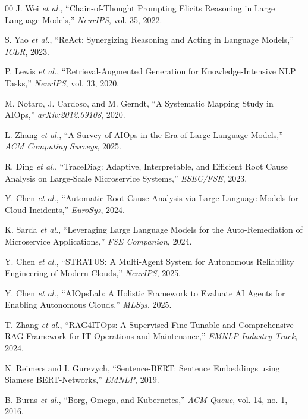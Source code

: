 \documentclass[conference]{IEEEtran}
\begin{document}
{\scriptsize
\begin{thebibliography}{00}
\setlength{\itemsep}{0pt}
\setlength{\parskip}{0pt}
J. Wei \emph{et al.}, ``Chain-of-Thought Prompting Elicits Reasoning in
Large Language Models,'' \emph{NeurIPS}, vol. 35, 2022.

S. Yao \emph{et al.}, ``ReAct: Synergizing Reasoning and Acting in
Language Models,'' \emph{ICLR}, 2023.

P. Lewis \emph{et al.}, ``Retrieval-Augmented Generation for
Knowledge-Intensive NLP Tasks,'' \emph{NeurIPS}, vol. 33, 2020.

M. Notaro, J. Cardoso, and M. Gerndt, ``A Systematic Mapping Study in
AIOps,'' \emph{arXiv:2012.09108}, 2020.

L. Zhang \emph{et al.}, ``A Survey of AIOps in the Era of Large Language
Models,'' \emph{ACM Computing Surveys}, 2025.

R. Ding \emph{et al.}, ``TraceDiag: Adaptive, Interpretable, and
Efficient Root Cause Analysis on Large-Scale Microservice Systems,''
\emph{ESEC/FSE}, 2023.

Y. Chen \emph{et al.}, ``Automatic Root Cause Analysis via Large Language
Models for Cloud Incidents,'' \emph{EuroSys}, 2024.

K. Sarda \emph{et al.}, ``Leveraging Large Language Models for the
Auto-Remediation of Microservice Applications,'' \emph{FSE Companion},
2024.

Y. Chen \emph{et al.}, ``STRATUS: A Multi-Agent System for Autonomous
Reliability Engineering of Modern Clouds,'' \emph{NeurIPS}, 2025.

Y. Chen \emph{et al.}, ``AIOpsLab: A Holistic Framework to Evaluate AI
Agents for Enabling Autonomous Clouds,'' \emph{MLSys}, 2025.

T. Zhang \emph{et al.}, ``RAG4ITOps: A Supervised Fine-Tunable and
Comprehensive RAG Framework for IT Operations and Maintenance,''
\emph{EMNLP Industry Track}, 2024.

N. Reimers and I. Gurevych, ``Sentence-BERT: Sentence Embeddings using
Siamese BERT-Networks,'' \emph{EMNLP}, 2019.

B. Burns \emph{et al.}, ``Borg, Omega, and Kubernetes,'' \emph{ACM
Queue}, vol. 14, no. 1, 2016.

\end{thebibliography}
}
\end{document}
